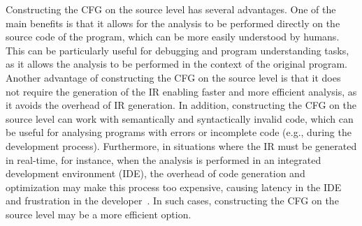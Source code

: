 Constructing the CFG on the source level has several advantages.
One of the main benefits is that it allows for the analysis to be performed directly
on the source code of the program, which can be more easily understood by humans.
This can be particularly useful for debugging and program understanding tasks,
as it allows the analysis to be performed in the context of the original program.
Another advantage of constructing the CFG on the source level is that it does not
require the generation of the IR enabling faster and more efficient analysis,
as it avoids the overhead of IR generation.
In addition, constructing the CFG on the source level can work with semantically
and syntactically invalid code, which can be useful for analysing programs with
errors or incomplete code (e.g., during the development process).
Furthermore, in situations where the IR must be generated in real-time,
for instance, when the analysis is performed in an integrated development environment (IDE),
the overhead of code generation and optimization may make this process too expensive,
causing latency in the IDE and frustration in the developer~\cite{piskachev2022far}.
In such cases, constructing the CFG on the source level
may be a more efficient option.

